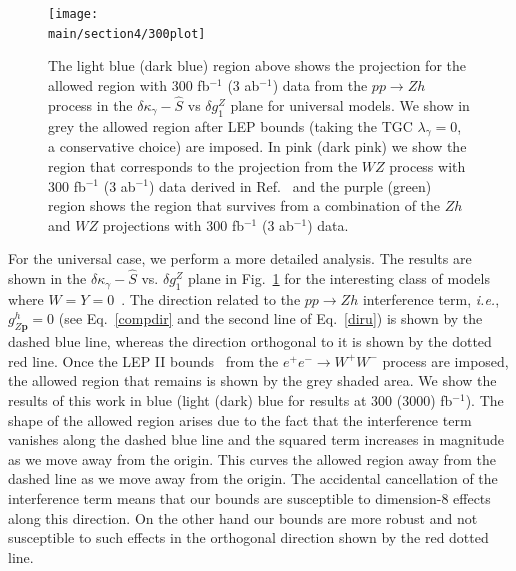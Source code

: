 \documentclass[../report.tex]{subfiles}
\providecommand{\main}{..}
\begin{document}
\begin{figure}[!t]
\texttt{[image: \\main/section4/300plot]}
\caption{The light blue (dark blue) region above shows the projection for the allowed region with 300 fb$^{-1}$ (3 ab$^{-1}$) data from the 
$pp \to Zh$ process  in the $\delta \kappa_\gamma-\hat{S}$ vs $\delta g^Z_1$ plane for universal models. We show in grey the allowed region after LEP bounds (taking the TGC $\lambda_\gamma=0$, a conservative choice) are imposed.  In pink (dark pink)  we show the region that corresponds to the projection from the $WZ$ process  with 300 fb$^{-1}$ (3 ab$^{-1}$) data derived in Ref.~\cite{Franceschini:2017xkh} and the purple (green) region shows the region that survives from a combination of the $Zh$ and $WZ$ projections with 300 fb$^{-1}$ (3 ab$^{-1}$) data.}\label{bounds}
\end{figure} 

For the universal case, we perform a more detailed analysis. The results are shown in the 
$\delta \kappa_\gamma-\hat{S}$ vs. $\delta g^Z_1$ plane  in Fig.~\ref{bounds} for the interesting class of models where $W=Y=0$~\cite{Franceschini:2017xkh}. The  
direction related to the $pp \to Zh$ interference term, \textit{i.e.}, $g^h_{Z\textbf{p}}=0$ (see Eq.~\ref{compdir} and the second line of Eq.~\ref{diru}) is shown by the dashed blue line, whereas the direction orthogonal to it is shown by the dotted red line.  Once the LEP II bounds~\cite{LEP2} from the $e^+e^- \to W^+W^-$ 
process are imposed, the allowed region that remains is shown by the grey shaded area. We show the results of this work  in blue (light (dark) blue for results at
300 (3000) fb$^{-1}$).  The shape of the allowed region arises due to the fact that the interference term vanishes along the dashed blue line and the squared term increases in magnitude as we move away from the origin. This curves the allowed region away from the dashed line as we move away from the origin.  The accidental cancellation of the interference term means that our bounds are susceptible to dimension-8 effects along this direction. On the other hand our bounds are more robust and not susceptible to such effects in the orthogonal direction shown by the red dotted line.
\end{document}
